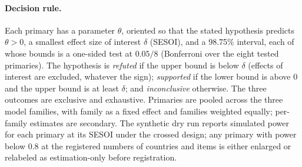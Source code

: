 \documentclass[11pt]{article}
\begin{document}
\paragraph{Decision rule.} Each primary has a parameter $\theta$, oriented so that the stated hypothesis predicts $\theta > 0$, a smallest effect size of interest $\delta$ (SESOI), and a 98.75\% interval, each of whose bounds is a one-sided test at $0.05/8$ (Bonferroni over the eight tested primaries). The hypothesis is \emph{refuted} if the upper bound is below $\delta$ (effects of interest are excluded, whatever the sign); \emph{supported} if the lower bound is above 0 and the upper bound is at least $\delta$; and \emph{inconclusive} otherwise. The three outcomes are exclusive and exhaustive. Primaries are pooled across the three model families, with family as a fixed effect and families weighted equally; per-family estimates are secondary. The synthetic dry run reports simulated power for each primary at its SESOI under the crossed design; any primary with power below 0.8 at the registered numbers of countries and items is either enlarged or relabeled as estimation-only before registration.
\end{document}
